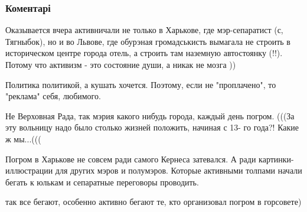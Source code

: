  
 
 
 
 
\subsubsection{Коментарі}
\label{sec:21_06_2018.fb.lesev_igor.1.pogrom_v_harjkovskom_gorsovete.cmt}

\begin{itemize} %

Оказывается вчера активничали не только в Харькове, где мэр-сепаратист (с,
Тягныбок), но и во Львове, где обурэная громадськисть вымагала не строить в
историческом центре города отель, а строить там наземную автостоянку (!!).
Потому что активизм - это состояние души, а никак не мозга ))

Политика политикой, а кушать хочется. Поэтому, если не "проплачено", то "реклама" себя, любимого.


Не Верховная Рада, так мэрия какого нибудь города, каждый день погром. (((За эту
вольницу надо было столько жизней положить, начиная с 13- го года?! Какие ж
мы...(((


Погром в Харькове не совсем ради самого Кернеса затевался. А ради
картинки-иллюстрации для других мэров и полумэров. Которые активными толпами
начали бегать к юлькам и сепаратные переговоры проводить.

так все бегают, особенно активно бегают те, кто организовал погром в горсовете)

\end{itemize} %
